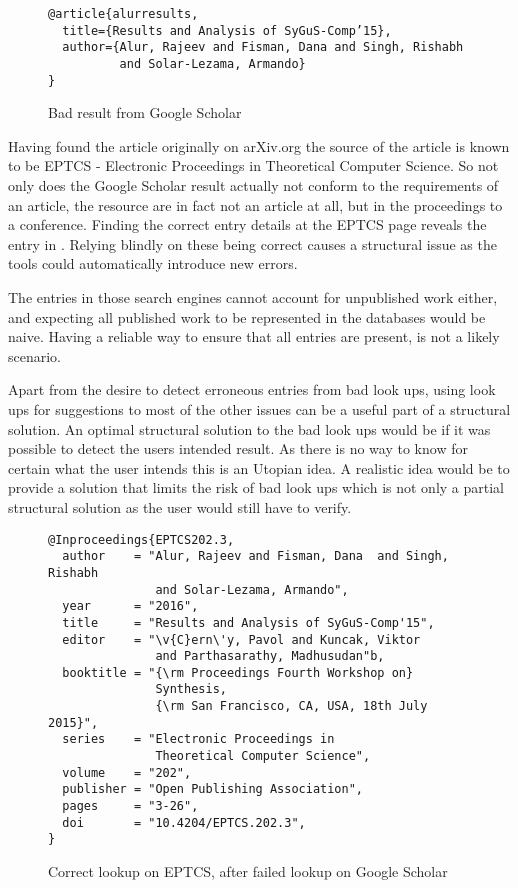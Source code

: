 \begin{figure}
  \centering
\begin{verbatim}
@article{alurresults,
  title={Results and Analysis of SyGuS-Comp’15},
  author={Alur, Rajeev and Fisman, Dana and Singh, Rishabh
          and Solar-Lezama, Armando}
}
\end{verbatim}
  \caption{Bad result from Google Scholar}
\label{fig:scholar_bad_result}
\end{figure}

Having found the article originally on arXiv.org the source of the
article is known to be EPTCS - Electronic Proceedings in Theoretical
Computer Science.  So not only does the Google Scholar result actually
not conform to the requirements of an article, the resource are in
fact not an article at all, but in the proceedings to a conference.
Finding the correct entry details at the EPTCS page reveals the entry
in .  Relying blindly on these being correct
causes a structural issue as the tools could automatically introduce
new errors.

The entries in those search engines cannot account for unpublished
work either, and expecting all published work to be represented in the
databases would be naive.  Having a reliable way to ensure that all
entries are present, is not a likely scenario.

Apart from the desire to detect erroneous entries from bad look ups,
using look ups for suggestions to most of the other issues can be a
useful part of a structural solution.  An optimal structural solution
to the bad look ups would be if it was possible to detect the users
intended result.  As there is no way to know for certain what the user
intends this is an Utopian idea.  A realistic idea would be to provide
a solution that limits the risk of bad look ups which is not only a
partial structural solution as the user would still have to verify.

\begin{figure}
  \centering
\begin{small}
\begin{verbatim}
@Inproceedings{EPTCS202.3,
  author    = "Alur, Rajeev and Fisman, Dana  and Singh, Rishabh 
               and Solar-Lezama, Armando",
  year      = "2016",
  title     = "Results and Analysis of SyGuS-Comp'15",
  editor    = "\v{C}ern\'y, Pavol and Kuncak, Viktor 
               and Parthasarathy, Madhusudan"b,
  booktitle = "{\rm Proceedings Fourth Workshop on}
               Synthesis,
               {\rm San Francisco, CA, USA, 18th July 2015}",
  series    = "Electronic Proceedings in 
               Theoretical Computer Science",
  volume    = "202",
  publisher = "Open Publishing Association",
  pages     = "3-26",
  doi       = "10.4204/EPTCS.202.3",
}
\end{verbatim}
\end{small}
  \caption{Correct lookup on EPTCS, after failed lookup on Google Scholar}
\label{fig:eptcs_lookup}
\end{figure}



